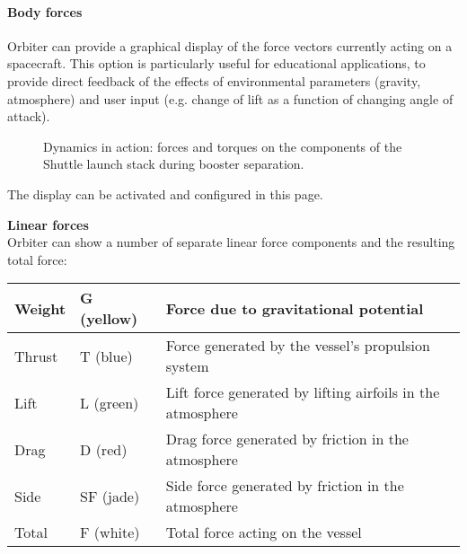 \documentclass[Orbiter User Manual.tex]{subfiles}
\begin{document}
\paragraph{Body forces}
Orbiter can provide a graphical display of the force vectors currently acting on a spacecraft. This option is particularly useful for educational applications, to provide direct feedback of the effects of environmental parameters (gravity, atmosphere) and user input (e.g. change of lift as a function of changing angle of attack).

\begin{figure}[H]
	\centering
	\caption{Dynamics in action: forces and torques on the components of the Shuttle launch stack during booster separation.}
\end{figure}

\noindent
The display can be activated and configured in this page.

\begin{figure}[H]
	\centering
\end{figure}

\noindent
\textbf{Linear forces}\\
Orbiter can show a number of separate linear force components and the resulting total force:

	\begin{longtable}{ |p{}|p{}|p{}| }
	\hline\rule{0pt}{2ex}
	Weight & G (yellow) & Force due to gravitational potential\\
	\hline\rule{0pt}{2ex}
	Thrust & T (blue) & Force generated by the vessel's propulsion system\\
	\hline\rule{0pt}{2ex}
	Lift & L (green) & Lift force generated by lifting airfoils in the atmosphere\\
	\hline\rule{0pt}{2ex}
	Drag & D (red) & Drag force generated by friction in the atmosphere\\
	\hline\rule{0pt}{2ex}
	Side & SF (jade) & Side force generated by friction in the atmosphere\\
	\hline\rule{0pt}{2ex}
	Total & F (white) & Total force acting on the vessel\\
	\hline
	\end{longtable}
\end{document}
